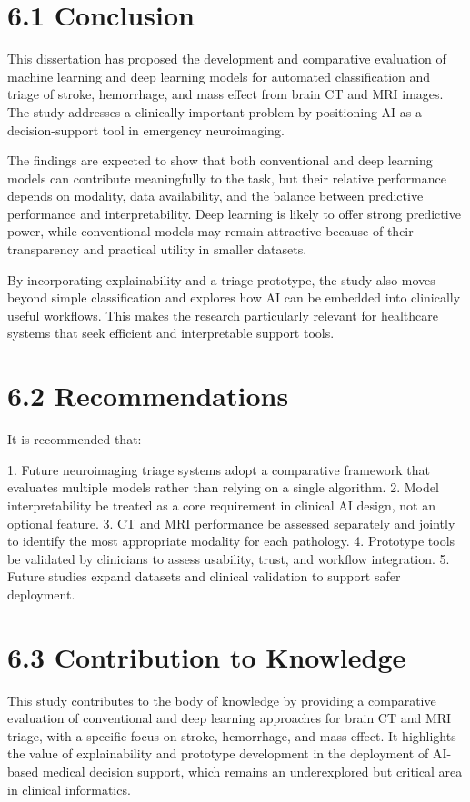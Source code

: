 \documentclass[12pt,a4paper]{report}
\begin{document}
\section{6.1 Conclusion}

This dissertation has proposed the development and comparative evaluation of machine learning and deep learning models for automated classification and triage of stroke, hemorrhage, and mass effect from brain CT and MRI images. The study addresses a clinically important problem by positioning AI as a decision-support tool in emergency neuroimaging.

The findings are expected to show that both conventional and deep learning models can contribute meaningfully to the task, but their relative performance depends on modality, data availability, and the balance between predictive performance and interpretability. Deep learning is likely to offer strong predictive power, while conventional models may remain attractive because of their transparency and practical utility in smaller datasets.

By incorporating explainability and a triage prototype, the study also moves beyond simple classification and explores how AI can be embedded into clinically useful workflows. This makes the research particularly relevant for healthcare systems that seek efficient and interpretable support tools.

\section{6.2 Recommendations}

It is recommended that:

1. Future neuroimaging triage systems adopt a comparative framework that evaluates multiple models rather than relying on a single algorithm.
2. Model interpretability be treated as a core requirement in clinical AI design, not an optional feature.
3. CT and MRI performance be assessed separately and jointly to identify the most appropriate modality for each pathology.
4. Prototype tools be validated by clinicians to assess usability, trust, and workflow integration.
5. Future studies expand datasets and clinical validation to support safer deployment.

\section{6.3 Contribution to Knowledge}

This study contributes to the body of knowledge by providing a comparative evaluation of conventional and deep learning approaches for brain CT and MRI triage, with a specific focus on stroke, hemorrhage, and mass effect. It highlights the value of explainability and prototype development in the deployment of AI-based medical decision support, which remains an underexplored but critical area in clinical informatics.
\end{document}
